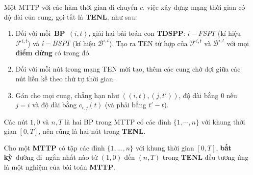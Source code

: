 \documentclass[../main.tex]{subfiles}
\begin{document}
\begin{definition}
Một MTTP với các hàm thời gian di chuyển \(c\),
việc xây dựng mạng thời gian có độ dài của cung, gọi tắt là
\textbf{TENL}, như sau:

\begin{enumerate}
\def\labelenumi{\arabic{enumi}.}
\tightlist
\item
  Đối với mỗi~\textbf{BP}~\((i, t)\), giải hai bài toán con
  \textbf{TDSPP}: \(i-FSPT\) (kí hiệu \(\mathcal F^{i,t}\)) và \(i-BSPT\)
  (kí hiệu \(\mathcal B^{i,t}\)). Tạo ra TEN từ hợp của
  \(\mathcal F^{i,t}\) và \(\mathcal B^{i,t}\) với mọi \textbf{điểm
  dừng} có trong đó.
\item
  Đối với mỗi nút trong mạng TEN mới tạo, thêm các cung chờ đợi giữa các
  nút liền kề theo thứ tự thời gian.
\item
  Gán cho mọi cung, chẳng hạn như \(((i, t), (j, t' ))\), độ dài bằng \(0\) nếu \(j = i\) và độ
  dài bằng \(c_{i,j} (t)\) (và phải bằng \(t' − t\)).
\end{enumerate}

\end{definition}

Các nút \(1, 0\) và \(n, T\) là hai BP trong MTTP có các đỉnh \(\{1,\cdots, n\}\) 
với khung thời gian \([0,T]\), nên cũng là hai nút trong \textbf{TENL}.

\begin{corollary}
\label{col:mttp}
Cho một \textbf{MTTP} có tập các đỉnh
\(\{1,...,n\}\) với khung thời gian \([0,T]\), \textbf{bất kỳ}~đường
đi~ngắn nhất nào từ \((1,0)\) đến \((n,T)\) trong \textbf{TENL} đều
tương ứng là một nghiệm của bài toán \textbf{MTTP}.
\end{corollary}
\end{document}
